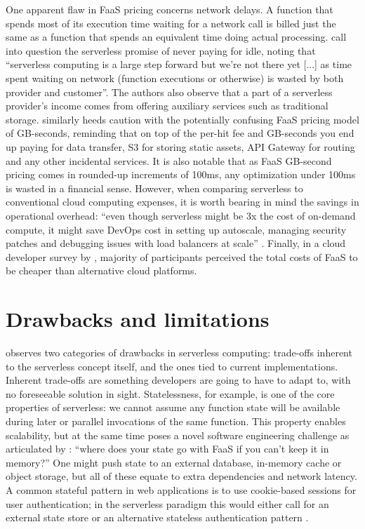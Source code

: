One apparent flaw in FaaS pricing concerns network delays. A function that spends most of its execution time waiting for a network call is billed just the same as a function that spends an equivalent time doing actual processing. \textcite{fox17} call into question the serverless promise of never paying for idle, noting that ``serverless computing is a large step forward but we're not there yet [...] as time spent waiting on network (function executions or otherwise) is wasted by both provider and customer''. The authors also observe that a part of a serverless provider's income comes from offering auxiliary services such as traditional storage. \textcite{eivy2017wary} similarly heeds caution with the potentially confusing FaaS pricing model of GB-seconds, reminding that on top of the per-hit fee and GB-seconds you end up paying for data transfer, S3 for storing static assets, API Gateway for routing and any other incidental services. It is also notable that as FaaS GB-second pricing comes in rounded-up increments of 100ms, any optimization under 100ms is wasted in a financial sense. However, when comparing serverless to conventional cloud computing expenses, it is worth bearing in mind the savings in operational overhead: ``even though serverless might be 3x the cost of on-demand compute, it might save DevOps cost in setting up autoscale, managing security patches and debugging issues with load balancers at scale'' \parencite{eivy2017wary}. Finally, in a cloud developer survey by \textcite{leitner18industrialpractice}, majority of participants perceived the total costs of FaaS to be cheaper than alternative cloud platforms.

\section{Drawbacks and limitations} \label{sec:limitations}

\textcite{robert2016serverlessarchitectures} observes two categories of drawbacks in serverless computing: trade-offs inherent to the serverless concept itself, and the ones tied to current implementations. Inherent trade-offs are something developers are going to have to adapt to, with no foreseeable solution in sight. Statelessness, for example, is one of the core properties of serverless: we cannot assume any function state will be available during later or parallel invocations of the same function. This property enables scalability, but at the same time poses a novel software engineering challenge as articulated by \textcite{robert2016serverlessarchitectures}: ``where does your state go with FaaS if you can’t keep it in memory?'' One might push state to an external database, in-memory cache or object storage, but all of these equate to extra dependencies and network latency. A common stateful pattern in web applications is to use cookie-based sessions for user authentication; in the serverless paradigm this would either call for an external state store or an alternative stateless authentication pattern \parencite{hendrickson16openlambda}.

